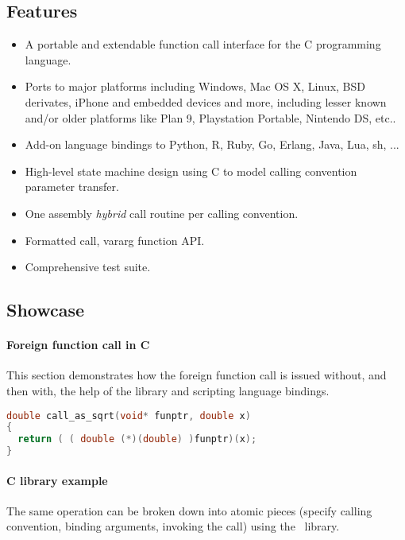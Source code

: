 \subsection{Features}

\begin{itemize}
\item A portable and extendable function call interface for the C programming 
language.
\item Ports to major platforms including Windows, Mac OS X, Linux, BSD derivates, iPhone and embedded devices and more, including lesser known and/or older platforms like Plan 9, Playstation Portable, Nintendo DS, etc..
\item Add-on language bindings to Python, R, Ruby, Go, Erlang, Java, Lua, sh, ...
\item High-level state machine design using C to model calling convention
parameter transfer.
\item One assembly \emph{hybrid} call routine per calling convention.
\item Formatted call, vararg function API.
\item Comprehensive test suite.
\end{itemize}

\pagebreak

\subsection{Showcase}

\paragraph{Foreign function call in C}
This section demonstrates how the foreign function call is issued without, and then 
with, the help of the  library and scripting language
bindings.

\begin{lstlisting}[language=c,caption=Foreign function call in C]
double call_as_sqrt(void* funptr, double x)
{
  return ( ( double (*)(double) )funptr)(x);
}
\end{lstlisting}

\paragraph{ C library example}

The same operation can be broken down into atomic pieces 
(specify calling convention, binding arguments, invoking the call)
using the \dc\ library.

